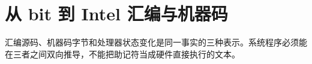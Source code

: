 \chapter{从 bit 到 Intel 汇编与机器码}

\begin{keyidea}
汇编源码、机器码字节和处理器状态变化是同一事实的三种表示。系统程序必须能
在三者之间双向推导，不能把助记符当成硬件直接执行的文本。
\end{keyidea}




